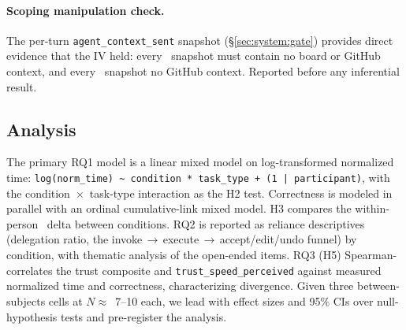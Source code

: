 \paragraph{Scoping manipulation check.}
The per-turn \texttt{agent\_context\_sent} snapshot (\S\ref{sec:system:gate})
provides direct evidence that the IV held: every \CI\ snapshot must contain no
board or GitHub context, and every \CII\ snapshot no GitHub context. Reported
before any inferential result.

\subsection{Analysis}
\label{sec:study:analysis}

The primary RQ1 model is a linear mixed model on log-transformed normalized
time: \texttt{log(norm\_time) \textasciitilde\ condition * task\_type +
(1\,|\,participant)}, with the condition~$\times$~task-type interaction as the
H2 test. Correctness is modeled in parallel with an ordinal cumulative-link
mixed model. H3 compares the within-person \NASATLX\ delta between conditions.
RQ2 is reported as reliance descriptives (delegation ratio, the
invoke\,$\to$\,execute\,$\to$\,accept/edit/undo funnel) by condition, with
thematic analysis of the open-ended items. RQ3 (H5) Spearman-correlates the
trust composite and \texttt{trust\_speed\_perceived} against measured normalized
time and correctness, characterizing divergence. Given three between-subjects
cells at $N\approx$~7--10 each, we lead with effect sizes and 95\% CIs over
null-hypothesis tests and pre-register the analysis.
